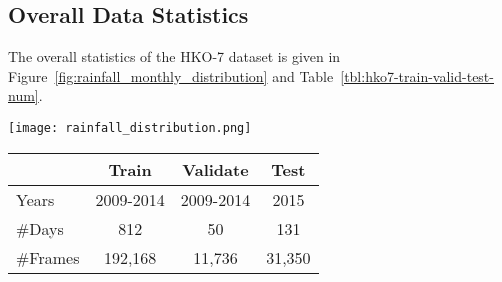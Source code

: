 \documentclass{article}
\begin{document}
\subsection{Overall Data Statistics}
The overall statistics of the HKO-7 dataset is given in Figure~\ref{fig:rainfall_monthly_distribution} and Table~\ref{tbl:hko7-train-valid-test-num}.
\begin{minipage}[h!]{\textwidth}
  \begin{minipage}[h!]{0.35\textwidth}
    \centering
    \texttt{[image: rainfall\_distribution.png]}
    \label{fig:rainfall_monthly_distribution}
  \end{minipage}
  \hfill
  \begin{minipage}[h!]{0.6\textwidth}
    \centering
{}
    \label{tbl:hko7-train-valid-test-num}
    \begin{tabular}{lccc}
      \toprule
      & Train & Validate & Test \\
      \midrule
      Years      & 2009-2014 & 2009-2014 & 2015 \\
      \#Days   & 812  & 50  & 131 \\
      \#Frames & 192,168 & 11,736 & 31,350 \\
      \bottomrule
    \end{tabular}
  \end{minipage}
\end{minipage}
\end{document}
